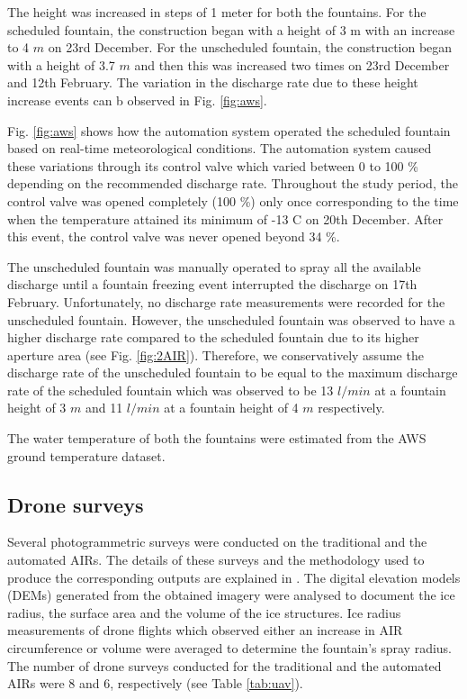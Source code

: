 \documentclass[tc, manuscript]{copernicus}
\begin{document}
The height was increased in steps of 1 meter for both the fountains. For the scheduled fountain, the
construction began with a height of 3 m with an increase to 4 $m$ on 23rd December. For the unscheduled
fountain, the construction began with a height of 3.7 $m$ and then this was increased two times on 23rd December
and 12th February. The variation in the discharge rate due to these height increase events can b observed in
Fig. \ref{fig:aws}. 

Fig. \ref{fig:aws} shows how the automation system operated the scheduled fountain based on real-time
meteorological conditions. The automation system caused these variations through its control valve which varied
between 0 to 100 \% depending on the recommended discharge rate. Throughout the study period, the control valve
was opened completely (100 \%) only once corresponding to the time when the temperature attained its minimum of
-13 \degree C on 20th December. After this event, the control valve was never opened beyond 34 \%.  

The unscheduled fountain was manually operated to spray all the available discharge until a fountain freezing
event interrupted the discharge on 17th February. Unfortunately, no discharge rate measurements were recorded
for the unscheduled fountain. However, the unscheduled fountain was observed to have a higher discharge rate
compared to the scheduled fountain due to its higher aperture area (see Fig. \ref{fig:2AIR}). Therefore, we
conservatively assume the discharge rate of the unscheduled fountain to be equal to the maximum discharge rate
of the scheduled fountain which was observed to be 13 $l/min$ at a fountain height of 3 $m$ and 11 $l/min$ at a
fountain height of 4 $m$ respectively.

The water temperature of both the fountains were estimated from the AWS ground temperature dataset.

\subsection{Drone surveys}

Several photogrammetric surveys were conducted on the traditional and the automated AIRs. The details of these
surveys and the methodology used to produce the corresponding outputs are explained in
\cite{balasubramanianInfluenceMeteorologicalConditions2022}. The digital elevation models (DEMs) generated from
the obtained imagery were analysed to document the ice radius, the surface area and the volume of the ice
structures. Ice radius measurements of drone flights which observed either an increase in AIR circumference or
volume were averaged to determine the fountain's spray radius. The number of drone surveys conducted for the
traditional and the automated AIRs were 8 and 6, respectively (see Table \ref{tab:uav}). 
\end{document}
